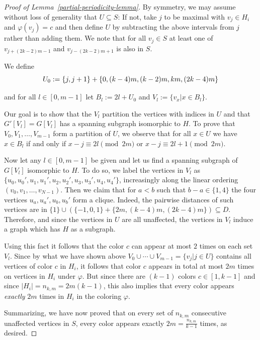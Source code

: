 \documentclass[a4paper,10pt,hidelinks]{amsart}
\renewcommand{\phi}{\ensuremath{\varphi}}
\newenvironment{claimproof}[1][\proofname]{\proof[#1]\renewcommand{\qedsymbol}{$\blacksquare$}}{\endproof}
\theoremstyle{definition}
\begin{document}
\begin{proof}[Proof of Lemma~\ref{partial-periodicity-lemma}]
\begin{claimproof}
        By symmetry, we may assume without loss of generality that $U \subseteq S$: If not, take $j$ to be maximal with $v_j \in H_i$ and $\phi(v_j)=c$ and then define $U$ by subtracting the above intervals from $j$ rather than adding them. We note that for all $v_j \in S$ at least one of $v_{j + (2k - 2)m - 1}$ and $v_{j - (2k - 2)m + 1}$ is also in $S$.

        We define        
        \begin{equation}\notag
            U_0 := \{j, j + 1\} + \{0, (k - 4)m, (k - 2)m, km, (2k-4)m\}
        \end{equation}

        and for all $l \in [0,m - 1]$ let $B_l := 2l + U_0$ and
        $V_l := \{v_x | x \in B_l\}$.
    
        Our goal is to show that the $V_l$ partition the vertices with indices in $U$ and that $G'[V_l]=G[V_l]$ has a spanning subgraph isomorphic to $H$. To prove that $V_0,V_1,\ldots,V_{m-1}$ form a partition of $U$, we observe that for all $x \in U$ we have $x \in B_l$ if and only if $x - j \equiv 2l \pmod{2m}$ or $x - j \equiv 2l + 1 \pmod{2m}$. 
        
        Now let any $l\in [0,m-1]$ be given and let us find a spanning subgraph of $G[V_l]$ isomorphic to $H$. To do so, we label the vertices in $V_l$ as $\{u_0, u_0', u_1, u_1', u_2, u_2', u_3, u_3', u_4, u_4'\}$, increasingly along the linear ordering $(v_0,v_1,\ldots,v_{N-1})$. Then we claim that for $a < b$ such that $b - a \in \{1, 4\}$ the four vertices $u_a, u_a', u_b, u_b'$ form a clique. Indeed, the pairwise distances of such vertices are in $\{1\}\cup(\{-1, 0, 1\} + \{2m, (k - 4)m, (2k - 4)m\}) \subseteq D$. Therefore, and since the vertices in $U$ are all unaffected, the vertices in $V_l$ induce a graph which has $H$ as a subgraph.

        Using this fact it follows that the color $c$ can appear at most $2$ times on each set $V_l$. Since by what we have shown above $V_0\cup \cdots \cup V_{m-1}=\{v_j|j\in U\}$ contains all vertices of color $c$ in $H_i$, it follows that color $c$ appears in total at most $2m$ times on vertices in $H_i$ under $\phi$. But since there are $(k-1)$ colors $c\in [1,k-1]$ and since $|H_i|=n_{k,m}=2m(k-1)$, this also implies that every color appears \emph{exactly} $2m$ times in $H_i$ in the coloring $\phi$.

        Summarizing, we have now proved that on every set of $n_{k,m}$ consecutive unaffected vertices in $S$, every color appears exactly $2m = \frac{n_{k,m}}{k-1}$ times, as desired.        
    \end{claimproof}


\end{proof}
\end{document}
